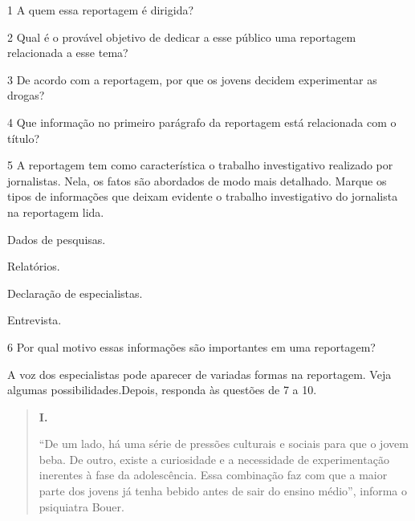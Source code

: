 \num{1} A quem essa reportagem é dirigida?


\num{2} Qual é o provável objetivo de dedicar a esse público uma
reportagem relacionada a esse tema?


\num{3} De acordo com a reportagem, por que os jovens decidem
experimentar as drogas?


\num{4} Que informação no primeiro parágrafo da reportagem está
relacionada com o título?


\num{5} A reportagem tem como característica o trabalho investigativo
realizado por jornalistas. Nela, os fatos são abordados de modo mais
detalhado. Marque os tipos de informações que deixam evidente o trabalho
investigativo do jornalista na reportagem lida.

\begin{boxlist}
 Dados de pesquisas.

 Relatórios.

 Declaração de especialistas.

 Entrevista.
\end{boxlist}

\num{6} Por qual motivo essas informações são importantes em uma
reportagem?


A voz dos especialistas pode aparecer de variadas formas na reportagem.
Veja algumas possibilidades.Depois, responda às questões de 7 a 10.

\begin{quote}
\textbf{I.}

“De um lado, há uma série de pressões culturais e sociais para que o
jovem beba. De outro, existe a curiosidade e a necessidade de
experimentação inerentes à fase da adolescência. Essa combinação faz com
que a maior parte dos jovens já tenha bebido antes de sair do ensino
médio”, informa o psiquiatra Bouer.
\end{quote}


